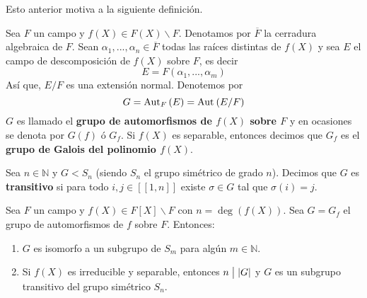 \documentclass[12pt]{report}
\theoremstyle{largebreak}
\newcommand\abs[1]{\ensuremath{\left|#1\right|}}
\newcommand\divides{\ensuremath{\bigm|}}
\newcommand\natint[1]{\ensuremath{\left[\!\left[ #1\right]\!\right]}}
\begin{document}
    Esto anterior motiva a la siguiente definición.

    \begin{mydef}
        Sea $F$ un campo y $f(X)\in F(X)\backslash F$. Denotamos por $\overline{F}$ la cerradura algebraica de $F$. Sean $\alpha_1,...,\alpha_n\in\overline{F}$ todas las raíces distintas de $f(X)$ y sea $E$ el campo de descomposición de $f(X)$ sobre $F$, es decir
        \begin{equation*}
            E=F(\alpha_1,...,\alpha_m)
        \end{equation*}
        Así que, $E/F$ es una extensión normal. Denotemos por
        \begin{equation*}
            G=\textup{Aut}_{F}\left(E\right)=\textup{Aut}_{}\left(E/F\right)
        \end{equation*}
        $G$ es llamado el \textbf{grupo de automorfismos de $f(X)$ sobre $F$} y en ocasiones se denota por $G(f)$ ó $G_f$. Si $f(X)$ es separable, entonces decimos que $G_f$ es el \textbf{grupo de Galois del polinomio $f(X)$}.
    \end{mydef}

    \begin{mydef}
        Sea $n\in\mathbb{N}$ y $G<S_n$ (siendo $S_n$ el grupo simétrico de grado $n$). Decimos que $G$ es \textbf{transitivo} si para todo $i,j\in\natint{1,n}$ existe $\sigma\in G$ tal que $\sigma(i)=j$.
    \end{mydef}

    \begin{theor}
        Sea $F$ un campo y $f(X)\in F[X]\backslash F$ con $n=\deg(f(X))$. Sea $G=G_f$ el grupo de automorfismos de $f$ sobre $F$. Entonces:
        \begin{enumerate}
            \item $G$ es isomorfo a un subgrupo de $S_m$ para algún $m\in\mathbb{N}$.
            \item Si $f(X)$ es irreducible y separable, entonces $n\divides\abs{G}$ y $G$ es un subgrupo transitivo del grupo simétrico $S_n$.
        \end{enumerate}
    \end{theor}
\end{document}
